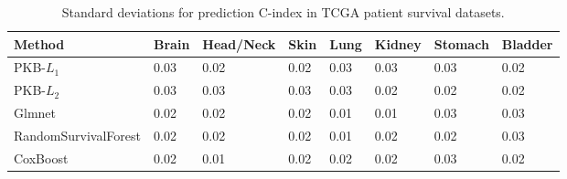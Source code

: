 \documentclass[a4paper,12pt]{article}
\begin{document}
\begin{table}[htp]
	\centering
	\begin{tabular}{llllllll}
		\hline
		Method               & Brain & Head/Neck & Skin & Lung & Kidney & Stomach & Bladder \\ \hline
		PKB-$L_1$               & 0.03  & 0.02 & 0.02     & 0.03 & 0.03   & 0.03    & 0.02    \\
		PKB-$L_2$               & 0.03  & 0.03 & 0.03     & 0.03 & 0.02   & 0.02    & 0.02    \\
		Glmnet               & 0.02  & 0.02 & 0.02     & 0.01 & 0.01   & 0.03    & 0.03    \\
		RandomSurvivalForest & 0.02  & 0.02 & 0.02     & 0.01 & 0.02   & 0.02    & 0.03    \\
		CoxBoost             & 0.02  & 0.01 & 0.02     & 0.02 & 0.02   & 0.03    & 0.02    \\ \hline
	\end{tabular}
	\caption{Standard deviations for prediction C-index in TCGA patient survival datasets.}
\end{table}
	\newpage
	
	
\end{document}
